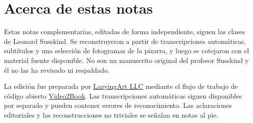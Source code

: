 \documentclass[11pt,oneside]{book}
\begin{document}
\frontmatter
\hypersetup{pageanchor=false}

\hypersetup{pageanchor=true}

\clearpage
\chapter{Acerca de estas notas}
Estas notas complementarias, editadas de forma independiente, siguen las clases de Leonard Susskind. Se reconstruyeron a partir de transcripciones automáticas, subtítulos y una selección de fotogramas de la pizarra, y luego se cotejaron con el material fuente disponible. No son un manuscrito original del profesor Susskind y él no las ha revisado ni respaldado.

La edición fue preparada por \href{https://lazying.art}{LazyingArt LLC} mediante el flujo de trabajo de código abierto \href{https://github.com/lachlanchen/Video2Book}{Video2Book}. Las transcripciones automáticas siguen disponibles por separado y pueden contener errores de reconocimiento. Las aclaraciones editoriales y las reconstrucciones no triviales se señalan en notas al pie.
\clearpage
\tableofcontents
\mainmatter










\end{document}

